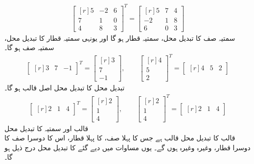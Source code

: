 \begin{align*}
\begin{bmatrix*}[r] 5&-2&6\\7&1&0\\4&8&3 \end{bmatrix*}^T=\begin{bmatrix*}[r] 5&7&4\\-2&1&8\\6&0&3\end{bmatrix*}
\end{align*}
سمتیہ صف کا تبدیل محل، سمتیہ قطار ہو گا اور یونہی سمتیہ قطار کا تبدیل محل، سمتیہ صف ہو گا۔
\begin{align*}
\begin{bmatrix*}[r] 3&7&-1 \end{bmatrix*}^T=\begin{bmatrix*}[r] 3\\7\\-1 \end{bmatrix*}, \quad\quad \begin{bmatrix*}[r] 4\\5\\2\end{bmatrix*}^T=\begin{bmatrix*}[r] 4&5&2 \end{bmatrix*}
\end{align*}
تبدیل محل کا تبدیل محل اصل قالب ہو گا۔
\begin{align*}
\begin{bmatrix*}[r] 2&1&4 \end{bmatrix*}^T=\begin{bmatrix*}[r] 2\\1\\4\end{bmatrix*}, \quad\quad \begin{bmatrix*}[r]2\\1\\4\end{bmatrix*}^T=\begin{bmatrix*}[r] 2&1&4 \end{bmatrix*}
\end{align*}
\quad قالب اور سمتیہ کا تبدیل محل\\
 قالب  کا تبدیل محل  قالب  ہے جس کا پہلا صف،  کا پہلا قطار، اس کا دوسرا صف  کا دوسرا قطار، وغیرہ وغیرہ ہوں گے۔ یوں مساوات  میں دیے گئے  کا تبدیل محل  درج ذیل ہو گا۔

